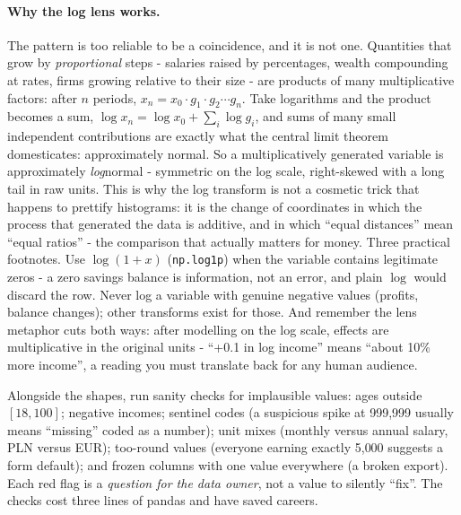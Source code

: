 \documentclass[11pt,a4paper]{article}
\begin{document}
\paragraph{Why the log lens works.} The pattern is too reliable to be a
coincidence, and it is not one. Quantities that grow by \emph{proportional}
steps - salaries raised by percentages, wealth compounding at rates,
firms growing relative to their size - are products of many multiplicative
factors: after $n$ periods, $x_n = x_0 \cdot g_1 \cdot g_2 \cdots g_n$.
Take logarithms and the product becomes a sum,
$\log x_n = \log x_0 + \sum_i \log g_i$, and sums of many small
independent contributions are exactly what the central limit theorem
domesticates: approximately normal. So a multiplicatively generated
variable is approximately \emph{log}normal - symmetric on the log scale,
right-skewed with a long tail in raw units. This is why the log transform
is not a cosmetic trick that happens to prettify histograms: it is the
change of coordinates in which the process that generated the data is
additive, and in which ``equal distances'' mean ``equal ratios'' - the
comparison that actually matters for money. Three practical footnotes.
Use $\log(1+x)$ (\texttt{np.log1p}) when the variable contains legitimate
zeros - a zero savings balance is information, not an error, and plain
$\log$ would discard the row. Never log a variable with genuine negative
values (profits, balance changes); other transforms exist for those.
And remember the lens metaphor cuts both ways: after modelling on the log
scale, effects are multiplicative in the original units - ``+0.1 in log
income'' means ``about 10\% more income'', a reading you must translate
back for any human audience.

Alongside the shapes, run sanity checks for implausible values: ages outside
$[18, 100]$; negative incomes; sentinel codes (a suspicious spike at
999{,}999 usually means ``missing'' coded as a number); unit mixes (monthly
versus annual salary, PLN versus EUR); too-round values (everyone earning
exactly 5{,}000 suggests a form default); and frozen columns with one value
everywhere (a broken export). Each red flag is a \emph{question for the data
owner}, not a value to silently ``fix''. The checks cost three lines of
pandas and have saved careers.
\end{document}
